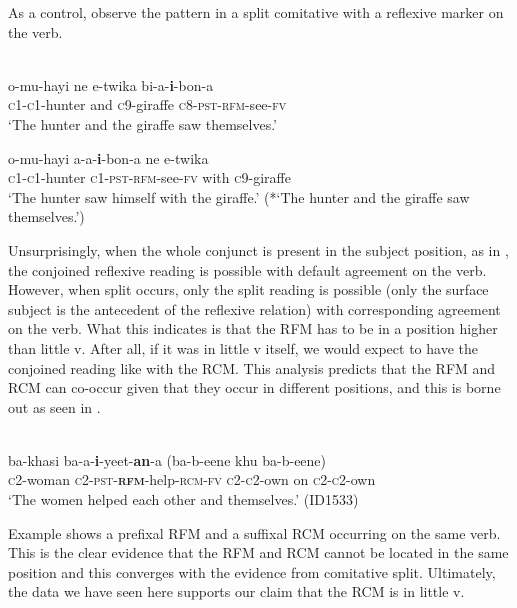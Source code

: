 \documentclass[output=paper]{langsci/langscibook}
\begin{document}
As a control, observe the pattern in a split comitative with a reflexive marker on the verb. 


\ea\label{ex:safir:22}
  \\
\ea\label{ex:safir:22a}
\gll  o-mu-hayi   ne   e-twika   bi-a-\textbf{{i}}{-bon-a}  \\
       \textsc{c1-c1}-hunter   and   \textsc{c}9-giraffe   \textsc{c}8-\textsc{pst-}\textsc{rfm}-see-\textsc{fv} \\
\glt   ‘The hunter and the giraffe saw themselves.’

\ex\label{ex:safir:22b}
\gll  o-mu-hayi   a-a-\textbf{i}-bon-a     ne   e-twika \\
       \textsc{c1-c1}-hunter  \textsc{c}1-\textsc{pst-}\textsc{rfm}-see-\textsc{fv}   with   \textsc{c}9-giraffe \\
\glt   ‘The hunter saw himself with the giraffe.’
\glt   (*‘The hunter and the giraffe saw themselves.’)
\z
\z

Unsurprisingly, when the whole conjunct is present in the subject position, as in , the conjoined reflexive reading is possible with default agreement on the verb. However, when split occurs, only the split reading is possible (only the surface subject is the antecedent of the reflexive relation) with corresponding agreement on the verb. What this indicates is that the RFM has to be in a position higher than little v. After all, if it was in little v itself, we would expect  to have the conjoined reading like with the RCM. This analysis predicts that the RFM and RCM can co-occur given that they occur in different positions, and this is borne out as seen in .


\ea\label{ex:safir:23}
  \\
\gll ba-khasi   ba-a-\textbf{i}-yeet-\textbf{an}-a     (ba-b-eene khu ba-b-eene) \\
\textsc{c}2-woman   \textsc{c2-pst-}\textbf{\textsc{rfm}}-help-\textsc{rcm}\textsc{-fv}   \textsc{c2-c}2-own on  \textsc{c2-c2}-own\\
\glt ‘The women helped each other and themselves.’ (ID1533)
\z


Example  shows a prefixal RFM and a suffixal RCM occurring on the same verb. This is the clear evidence that the RFM and RCM cannot be located in the same position and this converges with the evidence from comitative split. Ultimately, the data we have seen here supports our claim that the RCM is in little v. 
\end{document}
